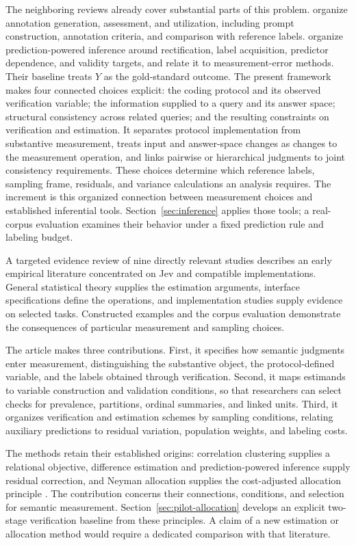 \documentclass[11pt,a4paper]{article}
\begin{document}
The neighboring reviews already cover substantial parts of this problem. \citet{tan2024} organize annotation generation, assessment, and utilization, including prompt construction, annotation criteria, and comparison with reference labels. \citet{zhanggao2026} organize prediction-powered inference around rectification, label acquisition, predictor dependence, and validity targets, and relate it to measurement-error methods. Their baseline treats $Y$ as the gold-standard outcome. The present framework makes four connected choices explicit: the coding protocol and its observed verification variable; the information supplied to a query and its answer space; structural consistency across related queries; and the resulting constraints on verification and estimation. It separates protocol implementation from substantive measurement, treats input and answer-space changes as changes to the measurement operation, and links pairwise or hierarchical judgments to joint consistency requirements. These choices determine which reference labels, sampling frame, residuals, and variance calculations an analysis requires. The increment is this organized connection between measurement choices and established inferential tools. Section~\ref{sec:inference} applies those tools; a real-corpus evaluation examines their behavior under a fixed prediction rule and labeling budget.

A targeted evidence review of nine directly relevant studies describes an early empirical literature concentrated on Jev and compatible implementations. General statistical theory supplies the estimation arguments, interface specifications define the operations, and implementation studies supply evidence on selected tasks. Constructed examples and the corpus evaluation demonstrate the consequences of particular measurement and sampling choices.

The article makes three contributions. First, it specifies how semantic judgments enter measurement, distinguishing the substantive object, the protocol-defined variable, and the labels obtained through verification. Second, it maps estimands to variable construction and validation conditions, so that researchers can select checks for prevalence, partitions, ordinal summaries, and linked units. Third, it organizes verification and estimation schemes by sampling conditions, relating auxiliary predictions to residual variation, population weights, and labeling costs.

The methods retain their established origins: correlation clustering supplies a relational objective, difference estimation and prediction-powered inference supply residual correction, and Neyman allocation supplies the cost-adjusted allocation principle \citep{bansal2004,sarndal1992,ppi2023}. The contribution concerns their connections, conditions, and selection for semantic measurement. Section~\ref{sec:pilot-allocation} develops an explicit two-stage verification baseline from these principles. A claim of a new estimation or allocation method would require a dedicated comparison with that literature.
\end{document}
